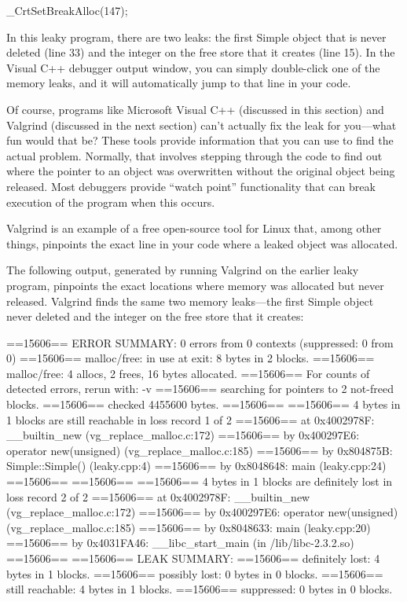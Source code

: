 \begin{cpp}
_CrtSetBreakAlloc(147);
\end{cpp}

In this leaky program, there are two leaks: the first Simple object that is never deleted (line 33) and the integer on the free store that it creates (line 15). In the Visual C++ debugger output window, you can simply double-click one of the memory leaks, and it will automatically jump to that line in your code.

Of course, programs like Microsoft Visual C++ (discussed in this section) and Valgrind (discussed in the next section) can’t actually fix the leak for you—what fun would that be? These tools provide information that you can use to find the actual problem. Normally, that involves stepping through the code to find out where the pointer to an object was overwritten without the original object being released. Most debuggers provide “watch point” functionality that can break execution of the program when this occurs.


Valgrind is an example of a free open-source tool for Linux that, among other things, pinpoints the exact line in your code where a leaked object was allocated.

The following output, generated by running Valgrind on the earlier leaky program, pinpoints the exact locations where memory was allocated but never released. Valgrind finds the same two memory leaks—the first Simple object never deleted and the integer on the free store that it creates:

\begin{shell}
==15606== ERROR SUMMARY: 0 errors from 0 contexts (suppressed: 0 from 0)
==15606== malloc/free: in use at exit: 8 bytes in 2 blocks.
==15606== malloc/free: 4 allocs, 2 frees, 16 bytes allocated.
==15606== For counts of detected errors, rerun with: -v
==15606== searching for pointers to 2 not-freed blocks.
==15606== checked 4455600 bytes.
==15606==
==15606== 4 bytes in 1 blocks are still reachable in loss record 1 of 2
==15606==    at 0x4002978F: __builtin_new (vg_replace_malloc.c:172)
==15606==    by 0x400297E6: operator new(unsigned) (vg_replace_malloc.c:185)
==15606==    by 0x804875B: Simple::Simple() (leaky.cpp:4)
==15606==    by 0x8048648: main (leaky.cpp:24)
==15606==
==15606==
==15606== 4 bytes in 1 blocks are definitely lost in loss record 2 of 2
==15606==    at 0x4002978F: __builtin_new (vg_replace_malloc.c:172)
==15606==    by 0x400297E6: operator new(unsigned) (vg_replace_malloc.c:185)
==15606==    by 0x8048633: main (leaky.cpp:20)
==15606==    by 0x4031FA46: __libc_start_main (in /lib/libc-2.3.2.so)
==15606==
==15606== LEAK SUMMARY:
==15606==     definitely lost: 4 bytes in 1 blocks.
==15606==     possibly lost:   0 bytes in 0 blocks.
==15606==     still reachable: 4 bytes in 1 blocks.
==15606==          suppressed: 0 bytes in 0 blocks.
\end{shell}

